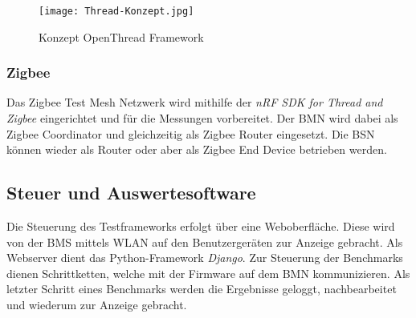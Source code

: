 \begin{figure}[H]
	\centering
	\texttt{[image: Thread-Konzept.jpg]}
	\caption{Konzept OpenThread Framework}\label{fig:ThreadKonzept}
\end{figure}



\subsubsection{Zigbee}\label{subsubsection:Zigbee}
Das Zigbee Test Mesh Netzwerk wird mithilfe der \textit{nRF SDK for Thread and Zigbee} eingerichtet und für die Messungen vorbereitet. Der BMN wird dabei als Zigbee Coordinator und gleichzeitig als Zigbee Router eingesetzt. Die BSN können wieder als Router oder aber als Zigbee End Device betrieben werden.


\subsection{Steuer und Auswertesoftware}\label{subsec:SteuerundAuswertesoftware}
Die Steuerung des Testframeworks erfolgt über eine Weboberfläche. Diese wird von der BMS mittels WLAN auf den Benutzergeräten zur Anzeige gebracht. Als Webserver dient das Python-Framework \textit{Django}. Zur Steuerung der Benchmarks dienen Schrittketten, welche mit der Firmware auf dem BMN kommunizieren. Als letzter Schritt eines Benchmarks werden die Ergebnisse geloggt, nachbearbeitet und wiederum zur Anzeige gebracht.

